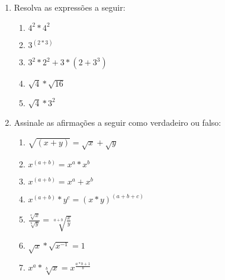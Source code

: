 \documentclass[11pt]{article}
\begin{document}
\begin{enumerate}
	\item Resolva as expressões a seguir:
	\begin{enumerate}
		\item $4^2 * 4^2$
		\item $3^{(2*3)}$ 
		\item $3^2*2^2 + 3*(2 + 3^3)$
		\item $\sqrt{4}*\sqrt{16}$
		\item $\sqrt{4}*3^2$
	\end{enumerate}

	\item Assinale as afirmações a seguir como verdadeiro ou falso:
	\begin{enumerate}
		\item $\sqrt{(x + y)} = \sqrt{x} + \sqrt{y}$
		\item $x^{(a+b)} = x^a*x^b$
		\item $x^{(a+b)} = x^a + x^b$
		\item $x^{(a+b)}*y^c = {(x*y)}^{(a+b+c)}$
		\item $\frac{\sqrt[a]{x}}{\sqrt[b]{y}} = \sqrt[a+b]{\frac{x}{y}}$
		\item $\sqrt{x}*\sqrt{x^{-1}} = 1$
		\item $x^{a}*\sqrt[b]{x} = x^{\frac{a*b + 1}{b}}$
	\end{enumerate}
\end{enumerate}
\end{document}

